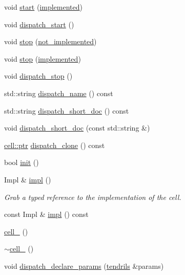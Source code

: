 \begin{DoxyCompactItemize}
\item 
void \hyperlink{structecto_1_1cell___afbca5bafc2261f303413fd431f0b12b6}{start} (\hyperlink{structecto_1_1cell___a63c5c3dd95630a508017730ee345c23a}{implemented})
\item 
void \hyperlink{structecto_1_1cell___af6929fe6c16db59235793d972ea20ff8}{dispatch\-\_\-start} ()
\item 
void \hyperlink{structecto_1_1cell___a689e109200f31da6edb491e28b101622}{stop} (\hyperlink{structecto_1_1cell___a3e48e52421d132bb2bb4e343f771abeb}{not\-\_\-implemented})
\item 
void \hyperlink{structecto_1_1cell___ac6da640a23124d5a154884cc6e45531c}{stop} (\hyperlink{structecto_1_1cell___a63c5c3dd95630a508017730ee345c23a}{implemented})
\item 
void \hyperlink{structecto_1_1cell___a0951afcee7f4aa52f957f1a6ecc2bfb7}{dispatch\-\_\-stop} ()
\item 
std\-::string \hyperlink{structecto_1_1cell___a288dac8bba40036b3f3e6b0641833039}{dispatch\-\_\-name} () const 
\item 
std\-::string \hyperlink{structecto_1_1cell___aea843d10de8a002ada9a29bec2ecb815}{dispatch\-\_\-short\-\_\-doc} () const 
\item 
void \hyperlink{structecto_1_1cell___a8d9ca18e234396fcdc1875507d3e11a8}{dispatch\-\_\-short\-\_\-doc} (const std\-::string \&)
\item 
\hyperlink{structecto_1_1cell_af2cab9d2bc012088c4f58c40da57a862}{cell\-::ptr} \hyperlink{structecto_1_1cell___ae2868bb59ddb378cbe7b98fd4e776930}{dispatch\-\_\-clone} () const 
\item 
bool \hyperlink{structecto_1_1cell___a06749143e390dcc5fd90f5076620108c}{init} ()
\item 
Impl \& \hyperlink{structecto_1_1cell___a625990e6ac4da1df9be69681881d3e28}{impl} ()
\begin{DoxyCompactList}\small\item\em Grab a typed reference to the implementation of the cell. \end{DoxyCompactList}\item 
const Impl \& \hyperlink{structecto_1_1cell___a05fe9ed5d606a54f761c104f45994a5e}{impl} () const 
\item 
\hyperlink{structecto_1_1cell___a8c5059153f9529bf895e3d82f05f5d7e}{cell\-\_\-} ()
\item 
\hyperlink{structecto_1_1cell___a30176d85396dd679e227a272918f422f}{$\sim$cell\-\_\-} ()
\item 
void \hyperlink{structecto_1_1cell___a0e435a14e4cc1d5cd7d80a16f2776565}{dispatch\-\_\-declare\-\_\-params} (\hyperlink{classecto_1_1tendrils}{tendrils} \&params)

\end{DoxyCompactItemize}
